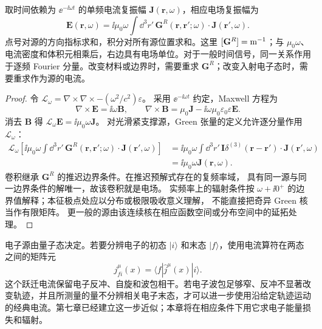 \begin{proposition}[源到场的线性映射]
取时间依赖为 $\ee^{-\ii\omega t}$ 的单频电流复振幅 $\mathbf J(\mathbf r,\omega)$，相应电场复振幅为
\begin{equation}
\boxed{
\mathbf E(\mathbf r,\omega)
=\ii\mu_0\omega\int\dd^3r'\,
\mathbf G^R(\mathbf r,\mathbf r';\omega)\cdot
\mathbf J(\mathbf r',\omega).}
\label{eq:green_tensor_source_to_field_dp123}
\end{equation}
点号对源的方向指标求和，积分对所有源位置求和。这里 $[\mathbf G^R]={\rm m^{-1}}$；与 $\mu_0\omega$、电流密度和体积元相乘后，右边具有电场单位。对于一般时间信号，同一关系作用于逐频 Fourier 分量。改变材料或边界时，需要重求 $\mathbf G^R$；改变入射电子态时，需要重求作为源的电流。
\end{proposition}
\begin{proof}
令 $\mathcal L_\omega=\nabla\times\nabla\times-(\omega^2/c^2)\varepsilon$。
采用 $\ee^{-\ii\omega t}$ 约定，Maxwell 方程为
\[
 \nabla\times\mathbf E=\ii\omega\mathbf B,
 \qquad
 \nabla\times\mathbf B=\mu_0\mathbf J-\ii\omega\mu_0\varepsilon_0\varepsilon\mathbf E.
\]
消去 $\mathbf B$ 得 $\mathcal L_\omega\mathbf E=\ii\mu_0\omega\mathbf J$。
对光滑紧支撑源，Green 张量的定义允许逐分量作用 $\mathcal L_\omega$：
\begin{align*}
 \mathcal L_\omega\left[\ii\mu_0\omega\int\dd^3r'\,
 \mathbf G^R(\mathbf r,\mathbf r';\omega)\cdot\mathbf J(\mathbf r',\omega)\right]
 &=\ii\mu_0\omega\int\dd^3r'\,
 \mathbf I\delta^{(3)}(\mathbf r-\mathbf r')\cdot\mathbf J(\mathbf r',\omega)\\
 &=\ii\mu_0\omega\mathbf J(\mathbf r,\omega).
\end{align*}
卷积继承 $\mathbf G^R$ 的推迟边界条件。在推迟预解式存在的复频率域，
具有同一源与同一边界条件的解唯一，故该卷积就是电场。
实频率上的辐射条件按 $\omega+\ii0^+$ 的边界值解释；本征极点处应以分布或极限吸收意义理解，
不能直接把奇异 Green 核当作有限矩阵。
更一般的源由该连续核在相应函数空间或分布空间中的延拓处理。
\end{proof}


电子源由量子态决定。若要分辨电子的初态 $|i\rangle$ 和末态 $|f\rangle$，使用电流算符在两态之间的矩阵元
\[
j^\mu_{fi}(x)=\langle f|\hat j^\mu(x)|i\rangle.
\]
这个跃迁电流保留电子反冲、自旋和波包相干。若电子波包足够窄、反冲不显著改变轨迹，并且所测量的量不分辨相关电子末态，才可以进一步使用沿给定轨迹运动的经典电流。第七章已经建立这一步近似；本章将在相应条件下用它求电子能量损失和辐射。\cite{GarciaDeAbajo2010RMP,GarciaDeAbajoDiGiulio2021,RoquesCarmes2023APR}

